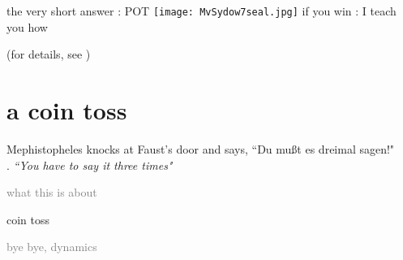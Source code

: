 \begin{frame}{the very short answer : POT}
\texttt{[image: MvSydow7seal.jpg]}
\bigskip
if you win : I teach you how

\vfill\hfill (for details, see \wwwcb{})
\end{frame}  %

\section[a coin toss]
 {a coin toss}

\begin{frame}{}
\begin{bartlett}{
Mephistopheles knocks at Faust's door and says, ``Du
mu{\ss}t es dreimal sagen!"
\\{\color{yellow}.}\qquad
{\scriptsize\emph{``You have to say it three times"}}
        }
\end{bartlett}
\vfill
\begin{enumerate}
              \item \textcolor{gray}{\small
what this is about
                  }
              \item {\Large
{}
{coin toss}
                  }\textcolor{gray}{\small
              \item
{}
{\templatt}
              \item
{}
{\catlatt}
              \item
{}
{bye bye, dynamics}
                    }
            \end{enumerate}
\end{frame} %


